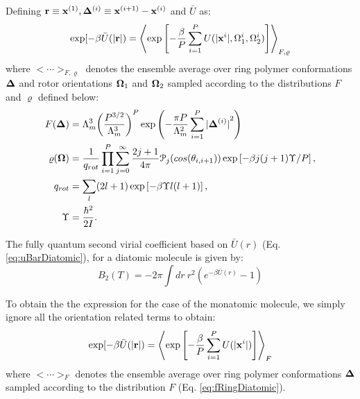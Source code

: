             Defining ${\mathbf {r}} \equiv {\mathbf {x}}^{(1)}, {\mathbf {\Delta}}^{(i)} \equiv {\mathbf {x}}^{(i+1)} - {\mathbf {x}}^{(i)}$ and $\bar{U}$ as:
            \begin{equation}
                \label{eq:uBarDiatomic}
                \exp [-\beta \bar{U} (|{\mathbf {r}}|) = \left< \exp \left[ -\displaystyle\frac{\beta}{P} \sum_{i=1}^P U (|{\mathbf {x}}^i|,\Omega_1^i,\Omega_2^i) \right] \right>_{F,\varrho}
            \end{equation}
            where $<\cdots>_{F,\varrho}$ denotes the ensemble average over ring polymer conformations ${\mathbf {\Delta}}$ and rotor orientations ${\mathbf {\Omega}}_1$ and ${\mathbf {\Omega}}_2$ sampled according to the distributions $F$ and $\varrho$ defined below:
            \begin{subequations}
                \begin{align}
                    F({\mathbf {\Delta}}) &= \Lambda_m^3 { \left( \frac{P^{3/2}}{\Lambda_m^3} \right)}^P \exp \left( - \frac{\pi P}{\Lambda_m^2} \displaystyle\sum\limits_{i=1}^P {|{\mathbf {\Delta}}^{(i)}|}^2 \right)\label{eq:fRingDiatomic}\\
                    \varrho({\mathbf {\Omega}}) &= \frac{1}{q_{rot}} \displaystyle\prod_{i=1}^P \sum_{j=0}^\infty \frac{2j+1}{4 \pi} \mathcal{P}_j (cos (\theta_{i,i+1})) \exp \left[-\beta j(j+1) \Upsilon/ P \right],\label{eq:rhoDiatomic}\\
                    q_{rot} &= \displaystyle\sum_{l} (2l + 1) \exp \left[-\beta \Upsilon l (l+1) \right],\nonumber\\
                    \Upsilon &= \displaystyle\frac{\hbar^2}{2I}\nonumber.
                \end{align}
            \end{subequations}

            The fully quantum second virial coefficient based on $\bar{U} (r)$ (Eq. \eqref{eq:uBarDiatomic}), for a diatomic molecule is given by:
            \begin{equation}
            \label{eq:b2Diatomic}
                B_2 (T) = -2 \pi \displaystyle\int dr~ r^2 (e^{-\beta \bar{U} (r)} - 1)
            \end{equation}

            To obtain the the expression for the case of the monatomic molecule, we simply ignore all the orientation related terms to obtain:
            \begin{equation}
                \label{eq:uBarMonatomic}
                \exp [-\beta \bar{U} (|{\mathbf {r}}|) = \left< \exp \left[ -\displaystyle\frac{\beta}{P} \sum_{i=1}^P U (|{\mathbf {x}}^i|) \right] \right>_F
            \end{equation}
            where $<\cdots>_F$ denotes the ensemble average over ring polymer conformations ${\mathbf {\Delta}}$ sampled according to the distribution $F$ (Eq. \eqref{eq:fRingDiatomic}).
            
